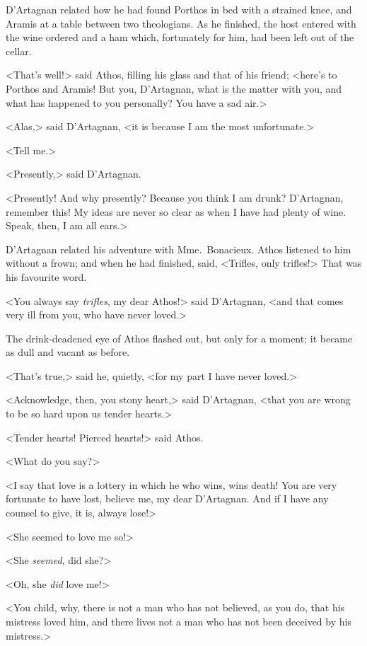 D'Artagnan related how he had found Porthos in bed with a strained knee, and Aramis at a table between two theologians. As he finished, the host entered with the wine ordered and a ham which, fortunately for him, had been left out of the cellar. 

<That's well!> said Athos, filling his glass and that of his friend; <here's to Porthos and Aramis! But you, D'Artagnan, what is the matter with you, and what has happened to you personally? You have a sad air.> 

<Alas,> said D'Artagnan, <it is because I am the most unfortunate.> 

<Tell me.> 

<Presently,> said D'Artagnan. 

<Presently! And why presently? Because you think I am drunk? D'Artagnan, remember this! My ideas are never so clear as when I have had plenty of wine. Speak, then, I am all ears.> 

D'Artagnan related his adventure with Mme.~Bonacieux. Athos listened to him without a frown; and when he had finished, said, <Trifles, only trifles!> That was his favourite word. 

<You always say \emph{trifles}, my dear Athos!> said D'Artagnan, <and that comes very ill from you, who have never loved.> 

The drink-deadened eye of Athos flashed out, but only for a moment; it became as dull and vacant as before. 

<That's true,> said he, quietly, <for my part I have never loved.> 

<Acknowledge, then, you stony heart,> said D'Artagnan, <that you are wrong to be so hard upon us tender hearts.> 

<Tender hearts! Pierced hearts!> said Athos. 

<What do you say?> 

<I say that love is a lottery in which he who wins, wins death! You are very fortunate to have lost, believe me, my dear D'Artagnan. And if I have any counsel to give, it is, always lose!> 

<She seemed to love me so!> 

<She \emph{seemed}, did she?> 

<Oh, she \emph{did} love me!> 

<You child, why, there is not a man who has not believed, as you do, that his mistress loved him, and there lives not a man who has not been deceived by his mistress.> 


